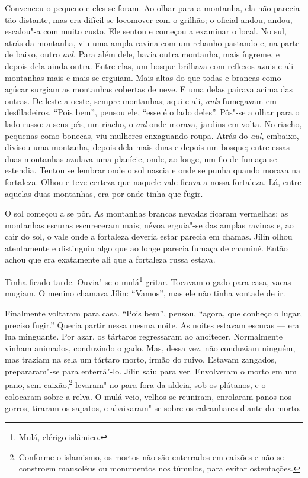 Convenceu o pequeno e eles se foram. Ao olhar para a montanha, ela não
parecia tão distante, mas era difícil se locomover com o grilhão; o oficial andou, andou, escalou"-a com muito custo. Ele sentou e começou a
examinar o local. No sul, atrás da montanha, viu uma ampla ravina com um
rebanho pastando e, na parte de baixo, outro \emph{aul}. Para além
dele, havia outra montanha, mais íngreme, e depois dela ainda
outra. Entre elas, um bosque brilhava com reflexos azuis e ali montanhas
mais e mais se erguiam. Mais altas do que todas e brancas como açúcar
surgiam as montanhas cobertas de neve. E uma delas pairava acima das
outras. De leste a oeste, sempre montanhas; aqui e ali, \emph{auls}
fumegavam em desfiladeiros. ``Pois bem'', pensou ele, ``esse é o lado
deles''. Pôs"-se a olhar para o lado russo: a seus pés, um riacho, o
\emph{aul} onde morava, jardins em volta. No riacho, pequenas
como bonecas, viu mulheres enxaguando roupa. Atrás do \emph{aul,}
embaixo, divisou uma montanha, depois dela mais duas e depois um bosque;
entre essas duas montanhas azulava uma planície, onde, ao longe, um fio
de fumaça se estendia. Tentou se lembrar onde o sol nascia e onde
se punha quando morava na fortaleza. Olhou e teve certeza que naquele
vale ficava a nossa fortaleza. Lá, entre aquelas duas montanhas, era por
onde tinha que fugir.

O sol começou a se pôr. As montanhas brancas nevadas ficaram vermelhas;
as montanhas escuras escureceram mais; névoa erguia"-se das amplas
ravinas e, ao cair do sol, o vale onde a fortaleza deveria estar parecia
em chamas. Jílin olhou atentamente e distinguiu algo que ao longe
parecia fumaça de chaminé. Então achou que era exatamente ali que a
fortaleza russa estava.

Tinha ficado tarde. Ouvia"-se o mulá\footnote{Mulá, clérigo islâmico.}
gritar. Tocavam o gado para casa, vacas mugiam. O menino chamava Jílin:
``Vamos'', mas ele não tinha vontade de ir.

Finalmente voltaram para casa. ``Pois bem'', pensou, ``agora, que
conheço o lugar, preciso fugir.'' Queria partir nessa mesma noite. As
noites estavam escuras --- era lua minguante. Por azar, os tártaros
regressaram ao anoitecer. Normalmente vinham animados, conduzindo o
gado. Mas, dessa vez, não conduziam ninguém, mas traziam na sela um
tártaro morto, irmão do ruivo. Estavam zangados, prepararam"-se para
enterrá"-lo. Jílin saiu para ver. Envolveram o morto em um pano, sem
caixão,\footnote{Conforme o islamismo, os mortos não são enterrados em
  caixões e não se constroem mausoléus ou monumentos nos túmulos, para
  evitar ostentações.} levaram"-no para fora da aldeia, sob os plátanos,
e o colocaram sobre a relva. O mulá veio, velhos se reuniram, enrolaram
panos nos gorros, tiraram os sapatos, e abaixaram"-se sobre os
calcanhares diante do morto.

